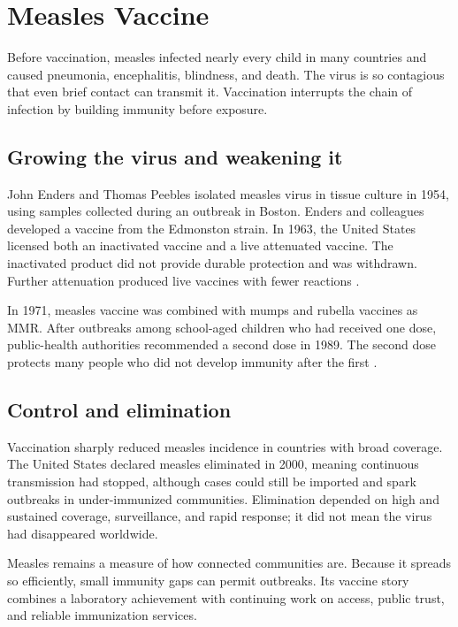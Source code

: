 \documentclass[12pt,oneside]{book}
\begin{document}
\chapter[Measles Vaccine]{Measles Vaccine}

Before vaccination, measles infected nearly every child in many countries and
caused pneumonia, encephalitis, blindness, and death. The virus is so
contagious that even brief contact can transmit it. Vaccination interrupts the
chain of infection by building immunity before exposure.

\section{Growing the virus and weakening it}
John Enders and Thomas Peebles isolated measles virus in tissue culture in 1954, using samples collected during an outbreak in Boston. Enders and colleagues developed a vaccine from the Edmonston strain. In 1963, the United States licensed both an inactivated vaccine and a live attenuated vaccine. The inactivated product did not provide durable protection and was withdrawn. Further attenuation produced live vaccines with fewer reactions \cite{cdcMeaslesHistory,cdcMeaslesPinkBook}.

In 1971, measles vaccine was combined with mumps and rubella vaccines as MMR.
After outbreaks among school-aged children who had received one dose,
public-health authorities recommended a second dose in 1989. The second dose
protects many people who did not develop immunity after the first
\cite{cdcMeaslesPinkBook}.

\section{Control and elimination}
Vaccination sharply reduced measles incidence in countries with broad coverage. The United States declared measles eliminated in 2000, meaning continuous transmission had stopped, although cases could still be imported and spark outbreaks in under-immunized communities. Elimination depended on high and sustained coverage, surveillance, and rapid response; it did not mean the virus had disappeared worldwide.

Measles remains a measure of how connected communities are. Because it spreads
so efficiently, small immunity gaps can permit outbreaks. Its vaccine story
combines a laboratory achievement with continuing work on access, public
trust, and reliable immunization services.
\end{document}
